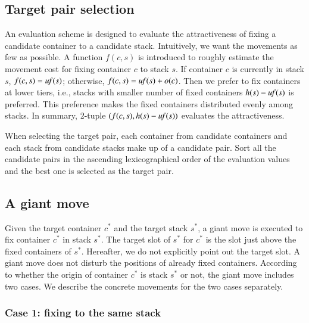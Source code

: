 \documentclass[review,3p,times,authoryear,12pt]{elsarticle}
\begin{document}
\subsection{Target pair selection}
\label{sec:tar}
An evaluation scheme is designed to evaluate the attractiveness of fixing a candidate container to a candidate stack.
Intuitively, we want the movements as few as possible. A function $f(c,s)$ is introduced to roughly estimate the movement cost for fixing container $c$ to stack $s$. If container $c$ is currently in stack $s$, $f(c,s)=\id{uf}(s)$; otherwise, $f(c,s)=\id{uf}(s)+o(c)$. Then we prefer to fix containers at lower tiers, i.e., stacks with smaller number of fixed containers $h(s)-\id{uf}(s)$ is preferred. This preference makes the fixed containers distributed evenly among stacks. In summary, 2-tuple $(f(c,s), h(s)-\id{uf}(s))$ evaluates the attractiveness.

When selecting the target pair, each container from candidate containers and each stack from candidate stacks make up of a candidate pair. Sort all the candidate pairs in the ascending lexicographical order of the evaluation values and the best one is selected as the target pair.

\subsection{A giant move}

Given the target container $c^*$ and the target stack $s^*$, a giant move is executed to fix container $c^*$ in stack $s^*$. The target slot of $s^*$ for $c^*$ is the slot just above the fixed containers of $s^*$. Hereafter, we do not explicitly point out the target slot.
A giant move does not disturb the positions of already fixed containers. According to whether the origin of container $c^*$ is stack $s^*$ or not, the giant move includes two cases. We describe the concrete movements for the two cases separately.

\subsubsection{Case 1: fixing to the same stack}
\end{document}
